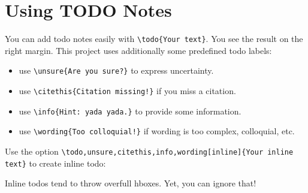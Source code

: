 \section{Using TODO Notes}

You can add todo notes easily with  \verb|\todo{Your text}|. You see the result on the right margin. This project uses additionally some predefined todo labels:

\begin{itemize}
	\setlength\itemsep{-0.75em} %
	\item use \verb|\unsure{Are you sure?}|  to express uncertainty.
	\item use \verb|\citethis{Citation missing!}|  if you miss a citation.
	\item use \verb|\info{Hint: yada yada.}|  to provide some information.
	\item use \verb|\wording{Too colloquial!}|  if wording is too complex, colloquial, etc.
\end{itemize}

Use the option \verb|\todo,unsure,citethis,info,wording[inline]{Your inline text}| to create inline todo:

Inline todos tend to throw overfull hboxes. Yet, you can ignore that!



\newpage
{}

